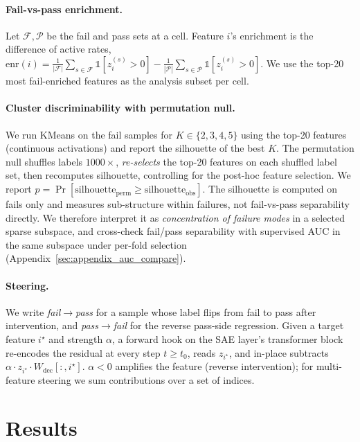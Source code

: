 \documentclass[11pt]{article}
\begin{document}
\paragraph{Fail-vs-pass enrichment.}
Let $\mathcal{F},\mathcal{P}$ be the fail and pass sets at a cell.
Feature $i$'s enrichment is the difference of active rates,
$\mathrm{enr}(i) = \tfrac{1}{|\mathcal{F}|}\!\sum_{s \in \mathcal{F}} \mathbb{1}[z^{(s)}_i\!>\!0] - \tfrac{1}{|\mathcal{P}|}\!\sum_{s \in \mathcal{P}} \mathbb{1}[z^{(s)}_i\!>\!0]$.
We use the top-20 most fail-enriched features as the analysis subset per cell.

\paragraph{Cluster discriminability with permutation null.}
We run KMeans on the fail samples for $K\!\in\!\{2,3,4,5\}$ using the top-20 features (continuous activations) and report the silhouette of the best $K$.
The permutation null shuffles labels $1000\times$, \emph{re-selects} the top-20 features on each shuffled label set, then recomputes silhouette, controlling for the post-hoc feature selection.
We report $p = \Pr[\mathrm{silhouette}_{\mathrm{perm}}\!\ge\!\mathrm{silhouette}_{\mathrm{obs}}]$.
The silhouette is computed on fails only and measures sub-structure within failures, not fail-vs-pass separability directly.
We therefore interpret it as \emph{concentration of failure modes} in a selected sparse subspace, and cross-check fail/pass separability with supervised AUC in the same subspace under per-fold selection (Appendix~\ref{sec:appendix_auc_compare}).

\paragraph{Steering.}
We write \emph{fail$\to$pass} for a sample whose label flips from fail to pass after intervention, and \emph{pass$\to$fail} for the reverse pass-side regression.
Given a target feature $i^\star$ and strength $\alpha$, a forward hook on the SAE layer's transformer block re-encodes the residual at every step $t \!\ge\! t_0$, reads $z_{i^\star}$, and in-place subtracts $\alpha \cdot z_{i^\star}\!\cdot\! W_{\mathrm{dec}}[:, i^\star]$.
$\alpha\!<\!0$ amplifies the feature (reverse intervention); for multi-feature steering we sum contributions over a set of indices.

\section{Results}
\label{sec:trajectory}
\end{document}
